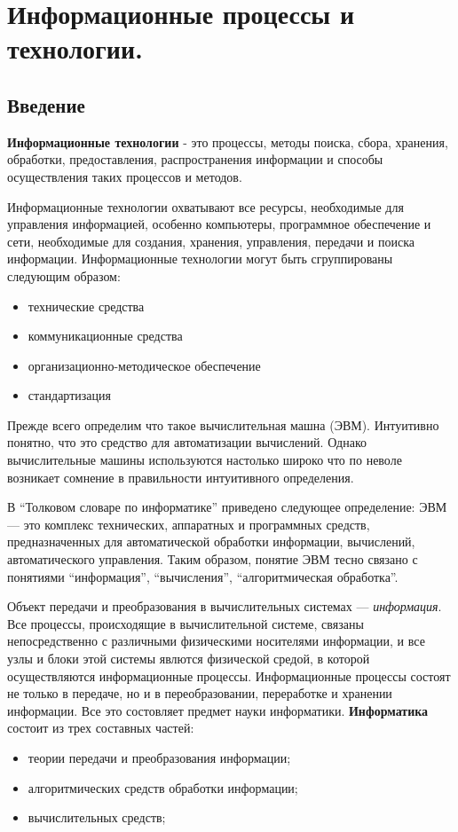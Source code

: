 \documentclass[a4paper]{article}
\begin{document}
\section{Информационные процессы и технологии.}

\subsection{Введение}
\textbf{Информационные технологии} - это процессы, методы поиска, сбора, хранения, обработки, предоставления, распространения информации и способы осуществления таких процессов и методов.

Информационные технологии охватывают все ресурсы,
необходимые для управления информацией, особенно компьютеры,
программное обеспечение и сети, необходимые для создания, хранения, управления, передачи и поиска информации.
Информационные технологии могут быть сгруппированы
следующим образом:
\begin{itemize}
    \item технические средства
    \item коммуникационные средства
    \item организационно-методическое обеспечение
    \item стандартизация
  \end{itemize}

Прежде всего определим что такое вычислительная машна (ЭВМ). Интуитивно понятно, что это средство для автоматизации вычислений. Однако вычислительные машины используются настолько широко что по неволе возникает сомнение в правильности интуитивного определения.

В ``Толковом словаре по информатике'' приведено следующее определение: ЭВМ --- это комплекс технических, аппаратных и программных средств, предназначенных для автоматической обработки информации, вычислений, автоматического управления. Таким образом, понятие ЭВМ тесно связано с понятиями ``информация'', ``вычисления'', ``алгоритмическая обработка''.

Объект передачи и преобразования в вычислительных системах --- \textit{информация}. Все процессы, происходящие в вычислительной системе, связаны непосредственно с различными физическими носителями информации, и все узлы и блоки этой системы явлются физической средой, в которой осуществляются информационные процессы. Информационные процессы состоят не только в передаче, но и в переобразовании, переработке и хранении информации. Все это состовляет предмет науки информатики. \textbf{Информатика} состоит из трех составных частей:
\begin{itemize}
  \item теории передачи и преобразования информации;
  \item алгоритмических средств обработки информации;
  \item вычислительных средств;
\end{itemize}
\end{document}
